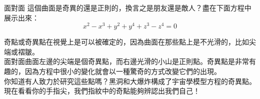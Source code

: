 \begin{surferPage}{面對面}
這個曲面是奇異的還是正則的，換言之是朋友還是敵人？盡在下面方程中展示出來：\\
\smallskip
\[x^2	- x^3+ y^2+ y^4+ z^3- z^4	=  0\]

\vspace{0.3cm}

奇點或奇異點在視覺上是可以被確定的，因為曲面在那些點上是不光滑的，比如尖端或褶皺。\\

\vspace{0.3cm}
面對面曲面左邊的尖端是個奇異點，而右邊光滑的小山是正則點。奇異點是非常有趣的，因為方程中很小的變化就會以一種驚奇的方式改變它們的出現。\\

\vspace{0.3cm}
你知道有人致力於研究這些點嗎？黑洞和大爆炸構成了宇宙學模型方程的奇異點。現在看看你的手指尖，我們指紋中的奇點能夠辨認出我們自己！
\end{surferPage}
